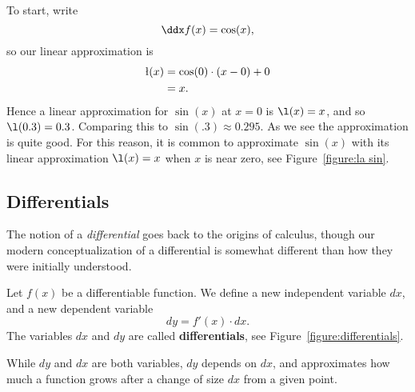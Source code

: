 \begin{solution}
To start, write
\[
\ddx f(x) = \cos(x),
\]
so our linear approximation is
\begin{align*}
\l(x) &= \cos(0)\cdot(x-0) + 0\\
&= x.
\end{align*}
Hence a linear approximation for $\sin(x)$ at $x=0$ is $\l(x) = x$,
and so $\l(0.3) = 0.3$.  Comparing this to $\sin(.3) \approx 0.295$. As
we see the approximation is quite good. For this reason, it is common
to approximate $\sin(x)$ with its linear approximation $\l(x) = x$
when $x$ is near zero, see Figure~\ref{figure:la sin}.
\end{solution}


\subsection*{Differentials}

The notion of a \textit{differential} goes back to the origins of
calculus, though our modern conceptualization of a differential is
somewhat different than how they were initially understood.

\begin{definition}
Let $f(x)$ be a differentiable function. We define a new
  independent variable $dx$, and a new dependent variable
\[
dy=f'(x)\cdot dx.
\] 
The variables $dx$ and $dy$ are called \textbf{differentials}, see
Figure~\ref{figure:differentials}.
\end{definition}
\begin{marginfigure}[0in]
\caption{While $dy$ and $dx$ are both variables, $dy$ depends on $dx$,
  and approximates how much a function grows after a change of size
  $dx$ from a given point.}
\label{figure:differentials}
\end{marginfigure}

